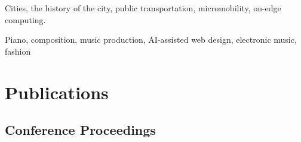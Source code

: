 \documentclass[10pt,letterpaper]{report}
\newcommand{\listitemspace}{0.25em}
\renewenvironment{itemize}
{\begin{list}{}{\setlength{\leftmargin}{0em}
                \setlength{\parskip}{0em}
                \setlength{\itemsep}{\listitemspace}
                \setlength{\parsep}{\listitemspace}}}
{\end{list}}
\begin{document}
    Cities, the history of the city, public transportation, micromobility, on-edge computing. \newline

    Piano, composition, music production, AI-assisted web design, electronic music, fashion





    \clearpage 
    \fi
    \section*{Publications}

    \subsection*{Conference Proceedings}
\end{document}
